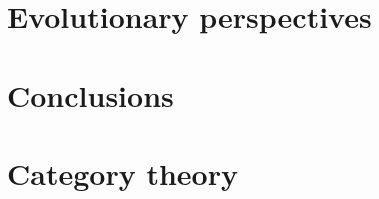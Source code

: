 \documentclass[aps,twocolumn]{revtex4-1}
\begin{document}
	
\section{Evolutionary perspectives}

\section{Conclusions}


 



\appendix

\section{Category theory}\label{app:CatTh}


%
\end{document}
